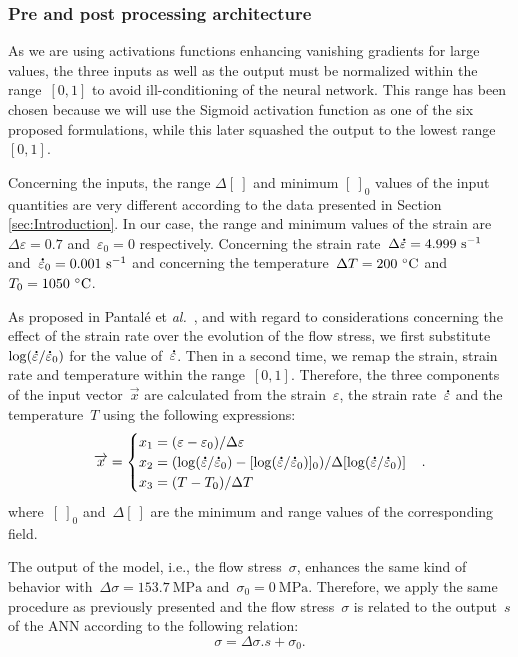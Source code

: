 \documentclass[algorithms,article,submit,pdftex,oneauthors]{Definitions/mdpi}
\makeatletter
\DeclareRobustCommand{\mdot}[1]{\accentset{\mbox{\bfseries .}}{#1}}
\DeclareRobustCommand{\ie}{i.e.,\@\xspace}
\DeclareRobustCommand{\eal}{et \emph{al.}\@\xspace}
\DeclareRobustCommand{\ps}{\text{s}^{-1}}
\DeclareRobustCommand{\MPa}{\text{MPa}}
\makeatother
\begin{document}
\subsubsection{Pre and post processing architecture}\label{subsubsec:ANN-pre}

As we are using activations functions enhancing vanishing gradients for large values, the three inputs as well as the output must be normalized within the range~$[0,1]$ to avoid ill-conditioning of the neural network.
This range has been chosen because we will use the Sigmoid activation function as one of the six proposed formulations, while this later squashed the output to the lowest range~$[0,1]$.

Concerning the inputs, the range $\Delta[~]$ and minimum $[~]_{0}$ values of the input quantities are very different according to the data presented in Section \ref{sec:Introduction}.
In our case, the range and minimum values of the strain are~$\Delta\varepsilon=0.7$ and~$\varepsilon_{0}=0$ respectively.
Concerning the strain rate~$\Delta\mdot{\varepsilon}=4.999~\ps$ and~$\mdot{\varepsilon}_{0}=0.001~\ps$ and concerning the temperature~$\Delta T=200~\celsius$ and~$T_{0}=1050~\celsius$.

As proposed in Pantalé \eal~\cite{Pantale-2021-EIN}, and with regard to considerations concerning the effect of the strain rate over the evolution of the flow stress, we first substitute~$\log(\mdot{\varepsilon}/\mdot{\varepsilon}_0)$ for the value of~$\mdot{\varepsilon}$.
Then in a second time, we remap the strain, strain rate and temperature within the range~$[0,1]$.
Therefore, the three components of the input vector~$\overrightarrow{x}$ are calculated from the strain~$\varepsilon$, the strain rate~$\mdot{\varepsilon}$ and the temperature~$T$ using the following expressions:
\begin{equation}
\overrightarrow{x}=
\begin{cases}
x_1 = \left(\varepsilon - \varepsilon_{0}\right)/\Delta\varepsilon \\
x_2 = \left(\log(\mdot{\varepsilon}/\mdot{\varepsilon}_0)-[\log(\mdot{\varepsilon}/\mdot{\varepsilon}_0)]_{0}\right)/\Delta[\log(\mdot{\varepsilon}/\mdot{\varepsilon}_0)]\\
x_3 = \left(T-T_{0}\right)/\Delta T
\end{cases}.
\label{eq:ANN-input}
\end{equation}
where~$[~]_{0}$ and~$\Delta[~]$ are the minimum and range values of the corresponding field.

The output of the model, \ie the flow stress~$\sigma$, enhances the same kind of behavior with~$\Delta\sigma=153.7~\MPa$ and~$\sigma_{0}=0~\MPa$.
Therefore, we apply the same procedure as previously presented and the flow stress~$\sigma$ is related to the output~$s$ of the ANN according to the following relation:
\begin{equation}
\sigma = \Delta\sigma.s + \sigma_{0}.\label{eq:ANN-output}
\end{equation}
\end{document}
